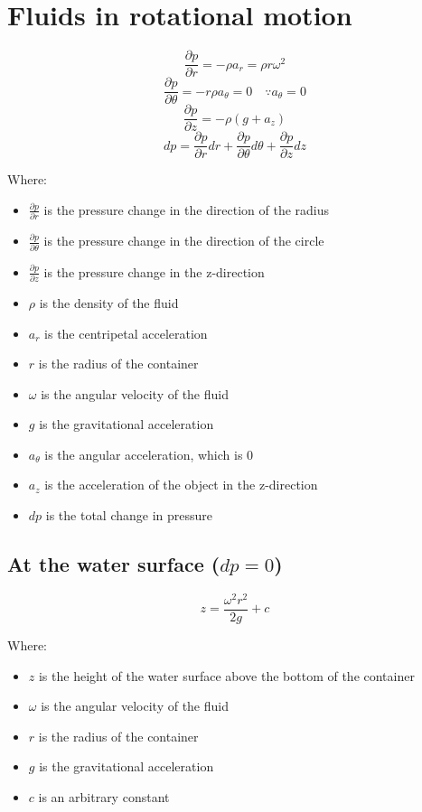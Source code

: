 \documentclass[11pt]{article}
\begin{document}
\newpage
\section{Fluids in rotational motion}
\label{sec:orgef7e9a9}
\[\frac{\partial p}{\partial r} = - \rho a_r = \rho r \omega^2\]
\[\frac{\partial p}{\partial \theta} = - r\rho a_{\theta} = 0 \quad \because a_{\theta} = 0\]
\[\frac{\partial p}{\partial z} = - \rho (g + a_z)\]
\[dp = \frac{\partial p}{\partial r} dr + \frac{\partial p}{\partial \theta} d \theta + \frac{\partial p}{\partial z} dz\]

Where:
\begin{itemize}
\item \(\frac{\partial p}{\partial r}\) is the pressure change in the direction of the radius
\item \(\frac{\partial p}{\partial \theta}\) is the pressure change in the direction of the circle
\item \(\frac{\partial p}{\partial z}\) is the pressure change in the z-direction
\item \(\rho\) is the density of the fluid
\item \(a_r\) is the centripetal acceleration
\item \(r\) is the radius of the container
\item \(\omega\) is the angular velocity of the fluid
\item \(g\) is the gravitational acceleration
\item \(a_{\theta}\) is the angular acceleration, which is 0
\item \(a_z\) is the acceleration of the object in the z-direction
\item \(dp\) is the total change in pressure
\end{itemize}

\newpage
\subsection{At the water surface (\(dp = 0\))}
\label{sec:org1c65371}
\[z = \frac{\omega^2 r^2}{2g} + c\]

Where:
\begin{itemize}
\item \(z\) is the height of the water surface above the bottom of the container
\item \(\omega\) is the angular velocity of the fluid
\item \(r\) is the radius of the container
\item \(g\) is the gravitational acceleration
\item \(c\) is an arbitrary constant
\end{itemize}
\end{document}
